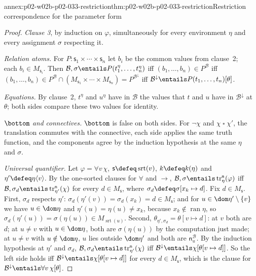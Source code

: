 \begin{annexitem}{annex:p02-w02b-p02-033-restriction}{thm:p02-w02b-p02-033-restriction}{Restriction correspondence for the parameter form}
\begin{proof}
\emph{Clause 3}, by induction on \(\varphi\), simultaneously for every
environment \(\eta\) and every assignment \(\sigma\) respecting it.

\emph{Relation atoms.}  For \(P:\mathsf s_1\times\cdots\times\mathsf s_n\)
let \(b_i\) be the common values from clause~2; each \(b_i\in
M_{\mathsf s_i}\).  Then \(\mathcal B,\sigma\entails
P(t_1^{\eta},\ldots,t_n^{\eta})\) iff \((b_1,\ldots,b_n)\in P^{\mathcal B}\)
iff \((b_1,\ldots,b_n)\in P^{\mathcal B}\cap(M_{\mathsf s_1}\times\cdots
\times M_{\mathsf s_n})=P^{\mathcal B^{\downarrow}}\) iff
\(\mathcal B^{\downarrow}\entails P(t_1,\ldots,t_n)[\theta]\).

\emph{Equations.}  By clause~2, \(t^{\eta}\) and \(u^{\eta}\) have in
\(\mathcal B\) the values that \(t\) and \(u\) have in
\(\mathcal B^{\downarrow}\) at \(\theta\); both sides compare these two
values for identity.

\emph{\(\bottom\) and connectives.}  \(\bottom\) is false on both sides.
For \(\neg\chi\) and \(\chi\mathbin{\square}\chi'\), the translation commutes
with the connective, each side applies the same truth function, and the
components agree by the induction hypothesis at the same \(\eta\) and
\(\sigma\).

\emph{Universal quantifier.}  Let \(\varphi=\forall v\,\chi\),
\(\mathsf s\defeq\operatorname{srt}(v)\), \(k\defeq k(\eta)\) and
\(\eta'\defeq\eta\langle v\rangle\).  By the one-sorted clauses for
\(\forall\) and \(\to\),
\(\mathcal B,\sigma\entails\operatorname{tr}^{\mathsf n}_{\eta}(\varphi)\)
iff \(\mathcal B,\sigma_d\entails\operatorname{tr}^{\mathsf n}_{\eta'}(\chi)\)
for every \(d\in M_{\mathsf s}\), where \(\sigma_d\defeq\sigma[x_k\mapsto d]\).
Fix \(d\in M_{\mathsf s}\).  First, \(\sigma_d\) respects \(\eta'\):
\(\sigma_d(\eta'(v))=\sigma_d(x_k)=d\in M_{\mathsf s}\); and for
\(u\in\dom\eta'\setminus\{v\}\) we have \(u\in\dom\eta\) and
\(\eta'(u)=\eta(u)\ne x_k\), because \(x_k\notin\operatorname{ran}\eta\), so
\(\sigma_d(\eta'(u))=\sigma(\eta(u))\in M_{\operatorname{srt}(u)}\).  Second,
\(\theta_{\eta',\sigma_d}=\theta[v\mapsto d]\): at \(v\) both are \(d\); at
\(u\ne v\) with \(u\in\dom\eta\), both are \(\sigma(\eta(u))\) by the
computation just made; at \(u\ne v\) with \(u\notin\dom\eta\), \(u\) lies
outside \(\dom\eta'\) and both are \(\mathsf n_u^{\mathcal B}\).  By the
induction hypothesis at \(\eta'\) and \(\sigma_d\),
\(\mathcal B,\sigma_d\entails\operatorname{tr}^{\mathsf n}_{\eta'}(\chi)\) iff
\(\mathcal B^{\downarrow}\entails\chi[\theta[v\mapsto d]]\).  So the left side
holds iff \(\mathcal B^{\downarrow}\entails\chi[\theta[v\mapsto d]]\) for
every \(d\in M_{\mathsf s}\), which is the clause for
\(\mathcal B^{\downarrow}\entails\forall v\,\chi[\theta]\).


\end{proof}
\end{annexitem}
